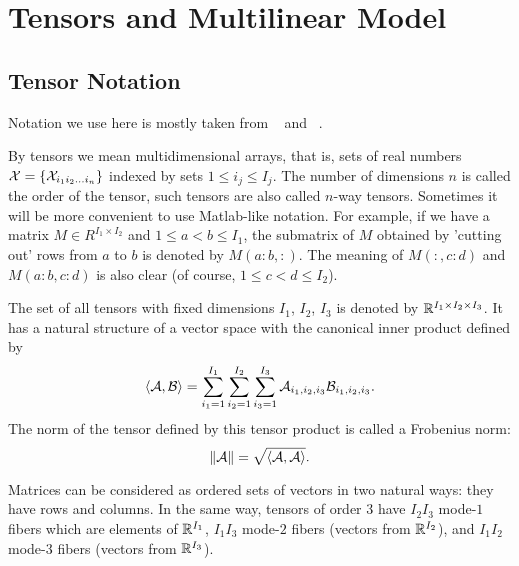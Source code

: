 \chapter{Tensors and Multilinear Model}
\section{Tensor Notation}
Notation we use here is mostly taken from ~\cite{elden_savas_2007} and ~\cite{kolda_bader_2009}.


By tensors we mean multidimensional arrays, that is, sets of real numbers 
$ \mathcal{X} = \{\mathcal{X}_{i_1 i_2 \dots i_n} \} $ indexed by sets $1 \leq i_j \leq I_j$.
The number of dimensions $n$ is called the order of the tensor, such tensors 
are also called $n$-way tensors.
Sometimes it will be more convenient to use Matlab-like notation. For example, if we have a matrix $M \in R^{I_1 \times I_2}$ and $1 \leq a < b \leq I_1$, the submatrix
of $M$ obtained by 'cutting out' rows from $a$ to $b$ is denoted by $M(a:b, :)$. The meaning of 
 $M(:, c:d)$ and $M(a:b, c:d)$ is also clear (of course, $1 \leq c < d \leq I_2$).
 


The set of all tensors with fixed dimensions $I_1$, $I_2$, $I_3$ is denoted by 
${\mathbb{R}}^{I_1 \times I_2 \times I_3}$. It has a natural structure of a vector space
with the canonical inner product defined by
\begin{equation}
    \langle \mathcal{A}, \mathcal{B} \rangle = \sum_{i_1 = 1}^{I_1}  \sum_{i_2 = 1}^{I_2} \sum_{i_3 = 1}^{I_3}  \mathcal{A}_{i_1, i_2, i_3} \mathcal{B}_{i_1, i_2, i_3}.
\end{equation}
The norm of the tensor defined by this tensor product is called a Frobenius norm:
\begin{equation}
    \| \mathcal{A} \| = \sqrt{ \langle \mathcal{A}, \mathcal{A} \rangle }.
\end{equation}


Matrices can be considered as ordered sets of vectors in two natural ways: they have
rows and columns. In the same way, tensors of order $3$ have $I_2 I_3 $ mode-$1$ fibers which
are elements of $\mathbb{R}^{I_1}$, $I_1 I_3$ mode-$2$ fibers (vectors from $\mathbb{R}^{I_2}$), and $I_1 I_2$ mode-$3$
fibers (vectors from $\mathbb{R}^{I_3}$).



